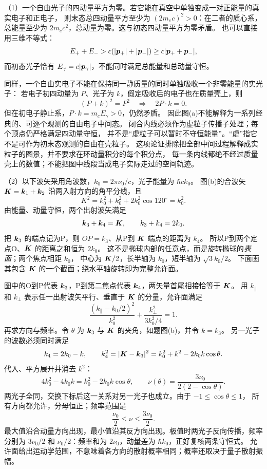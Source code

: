 \begin{advsolution}
（1）一个自由光子的四动量平方为零。若它能在真空中单独变成一对正能量的真实电子和正电子，
则末态总四动量平方至少为 $(2m_ec)^2>0$：在二者的质心系，
总能量至少为 $2m_ec^2$，总动量为零。这与初态四动量平方为零矛盾。
也可以直接用三维不等式：
\[
 E_++E_->c(|\bm{p}_+|+|\bm{p}_-|)
 \ge c|\bm{p}_++\bm{p}_-|,
\]
而初态光子恰有 $E_\gamma=c|\bm{p}_\gamma|$，不能同时满足总能量和总动量守恒。

同样，一个自由实电子不能在保持同一静质量的同时单独吸收一个非零能量的实光子：
若电子初四动量为 $P$、光子为 $k$，假定吸收后的电子也在质量壳上，则
\[
 (P+k)^2=P^2\quad\Rightarrow\quad2P\mathbin{\cdot}k=0.
\]
但在初电子静止系，$P\mathbin{\cdot}k=m_e E_\gamma>0$，仍然矛盾。
因此图(a)不能解释为一系列经典的、可逐个观测的自由电子中间态。
闭合内线必须作为虚粒子传播子处理；每个顶点仍严格满足四动量守恒，
并不是“虚粒子可以暂时不守恒能量”。“虚”指它不是可作为初末态观测的自由在壳粒子。
这项论证排除把全部中间过程解释成实粒子的图景，并不要求在环动量积分的每个积分点，
每一条内线都绝不经过质量壳上的数值；不能把图中线段当成电子实际走过的空间轨迹。

（2）以下波矢采用角波数，$k_0=2\pi\nu_0/c$，光子能量为 $\hbar ck_0$。
图(b)的合波矢 $\bm{K}=\bm{k}_1+\bm{k}_2$ 沿两入射方向的角平分线，且
\[
 K^2=k_0^2+k_0^2+2k_0^2\cos120^\circ=k_0^2.
\]
由能量、动量守恒，两个出射波矢满足
\[
 \bm{k}_3+\bm{k}_4=\bm{K},\qquad k_3+k_4=2k_0.
\]
把 $\bm{k}_3$ 的端点记为P，则 $OP=k_3$、从P到 $\bm{K}$ 端点的距离为 $k_4$。
所以P到两个定点O、$\bm{K}$ 的距离之和恒为 $2k_0$。
这不是椭球内部的任意点，而是旋转椭球的\emph{表面}；两个焦点相距 $k_0$，
中心为 $\bm{K}/2$，长半轴为 $k_0$，短半轴为 $\sqrt3k_0/2$。
下面画其包含 $\bm{K}$ 的一个截面；绕水平轴旋转即为完整允许面。
\begin{center}

\label{advA6:quality:A6-source-exercises:a3}

\end{center}
图中的O到P代表 $\bm{k}_3$，P到第二焦点代表 $\bm{k}_4$，两矢量首尾相接恰等于 $\bm{K}$。
用 $k_\parallel$ 和 $k_\perp$ 表示任一出射波矢平行、垂直于 $\bm{K}$ 的分量，允许面满足
\[
 \frac{(k_\parallel-k_0/2)^2}{k_0^2}
 +\frac{k_\perp^2}{3k_0^2/4}=1.
\]
再求方向与频率。令 $\theta$ 为 $\bm{k}_3$ 与 $\bm{K}$ 的夹角，如题图(b)，并令 $k=k_3$。
另一光子的波数必须同时满足
\[
 k_4=2k_0-k,\qquad
 k_4^2=|\bm{K}-\bm{k}_3|^2=k_0^2+k^2-2k_0k\cos\theta.
\]
代入、平方展开并消去 $k^2$：
\[
 4k_0^2-4k_0k=k_0^2-2k_0k\cos\theta,
 \qquad
 \boxed{\nu(\theta)=\frac{3\nu_0}{2(2-\cos\theta)}}.
\]
两光子全同，交换下标后这一关系对另一光子也成立。由于 $-1\le\cos\theta\le1$，
所有方向都允许，分母恒正；频率范围是
\[
 \boxed{\frac{\nu_0}{2}\le\nu\le\frac{3\nu_0}{2}}.
\]
最大值沿合动量方向出现，最小值沿其反方向出现。极值时两光子反向传播，频率分别为
$3\nu_0/2$ 和 $\nu_0/2$：频率和为 $2\nu_0$，动量差为 $\hbar k_0$，正好复核两条守恒式。
允许面给出运动学范围，不意味着各方向的散射概率相同；概率还取决于量子散射振幅。


\end{advsolution}
